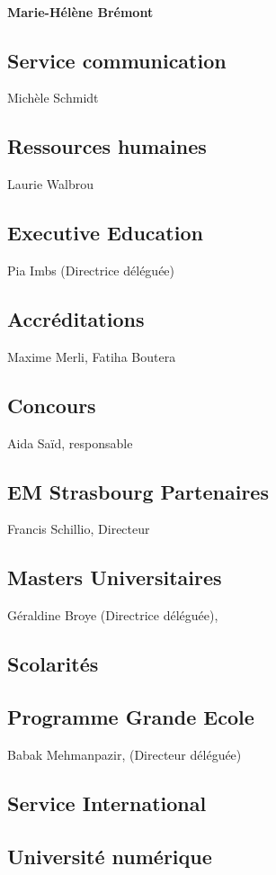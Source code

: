\documentclass{book}
\begin{document}
\paragraph{Marie-Hélène Brémont}

\subsection{Service communication}
Michèle Schmidt

\subsection{Ressources humaines}
Laurie Walbrou

\subsection{Executive Education }
Pia Imbs (Directrice déléguée)

\subsection{Accréditations}
Maxime Merli, Fatiha Boutera

\subsection{Concours }
Aida Saïd, responsable

\subsection{EM Strasbourg Partenaires }
Francis Schillio, Directeur 

\subsection{Masters Universitaires}
Géraldine Broye (Directrice déléguée),

 
\subsection{Scolarités}

\subsection{Programme Grande Ecole}
Babak Mehmanpazir, (Directeur déléguée)

\subsection{Service International}

\subsection{Université numérique}



\appendix
%
\printindex
\end{document}
